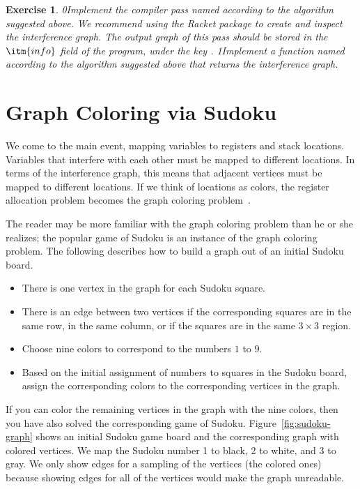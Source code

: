 \documentclass[7x10,nocrop]{TimesAPriori_MIT}%
\def\racketEd{0}
\def\pythonEd{1}
\def\edition{1}
\newcommand{\racket}[1]{{\if\edition\racketEd{#1}\fi}}
\newcommand{\python}[1]{{\if\edition\pythonEd #1\fi}}
\newtheorem{exercise}[theorem]{Exercise}
\begin{document}
\begin{exercise}\normalfont
\racket{Implement the compiler pass named \code{build\_interference} according
to the algorithm suggested above. We recommend using the Racket
  \code{graph} package to create and inspect the interference graph.
The output graph of this pass should be stored in the $\itm{info}$ field of
the program, under the key \code{conflicts}.}
%
\python{Implement a function named 
  according to the algorithm suggested above that
  returns the interference graph.}
\end{exercise}

  
\section{Graph Coloring via Sudoku}
\label{sec:graph-coloring}

We come to the main event, mapping variables to registers and stack
locations. Variables that interfere with each other must be mapped to
different locations.  In terms of the interference graph, this means
that adjacent vertices must be mapped to different locations.  If we
think of locations as colors, the register allocation problem becomes
the graph coloring problem~\citep{Balakrishnan:1996ve,Rosen:2002bh}.

The reader may be more familiar with the graph coloring problem than he
or she realizes; the popular game of Sudoku is an instance of the
graph coloring problem. The following describes how to build a graph
out of an initial Sudoku board.
\begin{itemize}
\item There is one vertex in the graph for each Sudoku square.
\item There is an edge between two vertices if the corresponding squares
  are in the same row, in the same column, or if the squares are in
  the same $3\times 3$ region.
\item Choose nine colors to correspond to the numbers $1$ to $9$.
\item Based on the initial assignment of numbers to squares in the
  Sudoku board, assign the corresponding colors to the corresponding
  vertices in the graph.
\end{itemize}
If you can color the remaining vertices in the graph with the nine
colors, then you have also solved the corresponding game of Sudoku.
Figure~\ref{fig:sudoku-graph} shows an initial Sudoku game board and
the corresponding graph with colored vertices.  We map the Sudoku
number 1 to black, 2 to white, and 3 to gray.  We only show edges for a
sampling of the vertices (the colored ones) because showing edges for
all of the vertices would make the graph unreadable.
\end{document}
